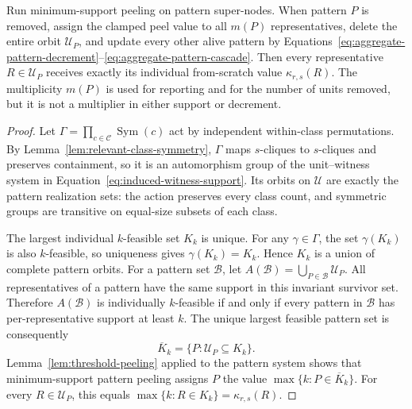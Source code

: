 \begin{theorem}
\label{thm:weighted-pattern-equivalence}
Run minimum-support peeling on pattern super-nodes.
%
When pattern $P$ is removed, assign the clamped peel value to all $m(P)$ representatives, delete the entire orbit $\mathcal U_P$, and update every other alive pattern by Equations~\eqref{eq:aggregate-pattern-decrement}--\eqref{eq:aggregate-pattern-cascade}.
%
Then every representative $R\in\mathcal U_P$ receives exactly its individual from-scratch value $\kappa_{r,s}(R)$.
%
The multiplicity $m(P)$ is used for reporting and for the number of units removed, but it is not a multiplier in either support or decrement.
\end{theorem}
\begin{proof}
Let $\Gamma=\prod_{c\in\mathcal C}\operatorname{Sym}(c)$ act by independent within-class permutations.
%
By Lemma~\ref{lem:relevant-class-symmetry}, $\Gamma$ maps $s$-cliques to $s$-cliques and preserves containment, so it is an automorphism group of the unit--witness system in Equation~\eqref{eq:induced-witness-support}.
%
Its orbits on $\mathcal U$ are exactly the pattern realization sets: the action preserves every class count, and symmetric groups are transitive on equal-size subsets of each class.

The largest individual $k$-feasible set $K_k$ is unique.
%
For any $\gamma\in\Gamma$, the set $\gamma(K_k)$ is also $k$-feasible, so uniqueness gives $\gamma(K_k)=K_k$.
%
Hence $K_k$ is a union of complete pattern orbits.
%
For a pattern set $\mathcal B$, let $A(\mathcal B)=\bigcup_{P\in\mathcal B}\mathcal U_P$.
%
All representatives of a pattern have the same support in this invariant survivor set.
%
Therefore $A(\mathcal B)$ is individually $k$-feasible if and only if every pattern in $\mathcal B$ has per-representative support at least $k$.
%
The unique largest feasible pattern set is consequently
\[
\overline K_k=\{P:\mathcal U_P\subseteq K_k\}.
\]
Lemma~\ref{lem:threshold-peeling} applied to the pattern system shows that minimum-support pattern peeling assigns $P$ the value $\max\{k:P\in\overline K_k\}$.
%
For every $R\in\mathcal U_P$, this equals $\max\{k:R\in K_k\}=\kappa_{r,s}(R)$.


\end{proof}
